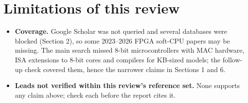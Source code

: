 \section{Limitations of this review}

\begin{itemize}
\item \textbf{Coverage.} Google Scholar was not queried and several databases were blocked (Section 2), so some 2023–2026 FPGA soft-CPU papers may be missing. The main search missed 8-bit microcontrollers with MAC hardware, ISA extensions to 8-bit cores and compilers for KB-sized models; the follow-up check covered them, hence the narrower claims in Sections 1 and 6.
\item \textbf{Leads not verified within this review's reference set.} None supports any claim above; check each before the report cites it.
\end{itemize}

